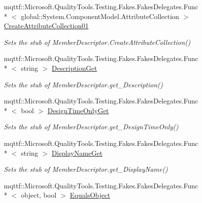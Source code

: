 \begin{DoxyCompactItemize}
mqttf\-::\-Microsoft.\-Quality\-Tools.\-Testing.\-Fakes.\-Fakes\-Delegates.\-Func\\*
$<$ global\-::\-System.\-Component\-Model.\-Attribute\-Collection $>$ \hyperlink{class_system_1_1_component_model_1_1_fakes_1_1_stub_member_descriptor_aee7f6c7af0b523d95c00d077dad8c11e}{Create\-Attribute\-Collection01}
\begin{DoxyCompactList}\small\item\em Sets the stub of Member\-Descriptor.\-Create\-Attribute\-Collection()\end{DoxyCompactList}\item 
mqttf\-::\-Microsoft.\-Quality\-Tools.\-Testing.\-Fakes.\-Fakes\-Delegates.\-Func\\*
$<$ string $>$ \hyperlink{class_system_1_1_component_model_1_1_fakes_1_1_stub_member_descriptor_a2c1db94f49bdaade9b34d44922383f40}{Description\-Get}
\begin{DoxyCompactList}\small\item\em Sets the stub of Member\-Descriptor.\-get\-\_\-\-Description()\end{DoxyCompactList}\item 
mqttf\-::\-Microsoft.\-Quality\-Tools.\-Testing.\-Fakes.\-Fakes\-Delegates.\-Func\\*
$<$ bool $>$ \hyperlink{class_system_1_1_component_model_1_1_fakes_1_1_stub_member_descriptor_a537461be9d8026ca17b8dab965dff24d}{Design\-Time\-Only\-Get}
\begin{DoxyCompactList}\small\item\em Sets the stub of Member\-Descriptor.\-get\-\_\-\-Design\-Time\-Only()\end{DoxyCompactList}\item 
mqttf\-::\-Microsoft.\-Quality\-Tools.\-Testing.\-Fakes.\-Fakes\-Delegates.\-Func\\*
$<$ string $>$ \hyperlink{class_system_1_1_component_model_1_1_fakes_1_1_stub_member_descriptor_ac1b402f6201da67069bbd0fdc109df03}{Display\-Name\-Get}
\begin{DoxyCompactList}\small\item\em Sets the stub of Member\-Descriptor.\-get\-\_\-\-Display\-Name()\end{DoxyCompactList}\item 
mqttf\-::\-Microsoft.\-Quality\-Tools.\-Testing.\-Fakes.\-Fakes\-Delegates.\-Func\\*
$<$ object, bool $>$ \hyperlink{class_system_1_1_component_model_1_1_fakes_1_1_stub_member_descriptor_aab5f312f3e17030a0bf0b8d91a3f68f7}{Equals\-Object}

\end{DoxyCompactItemize}
